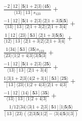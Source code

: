 \documentclass[varwidth, border=5pt]{standalone}
\begin{document}
\begin{my}
$\begin{gathered}
\scriptscriptstyle\frac{-2[12][𝟓|1+2|3⟩⟨4𝟓⟩}{⟨13⟩[13]s_{123}} +\\
\scriptscriptstyle\frac{-1[12][𝟓|1+2|3⟩⟨2|1+3|𝟓|𝟓⟩}{⟨13⟩[13]⟨2|1+3|2]⟨2|1+3|4]} +\\
\scriptscriptstyle\frac{1[12]⟨23⟩[𝟓3]⟨2|1+3|𝟓|𝟓⟩}{⟨12⟩[13]⟨2|1+3|2]⟨2|1+3|4]} +\\
\scriptscriptstyle\frac{1⟨34⟩[𝟓3]⟨3𝟓⟩s_{123}}{⟨23⟩⟨1|2+4|3]⟨3|𝟓|3]} +\\
\scriptscriptstyle\frac{-1[12][𝟓|1+2|3⟩⟨2𝟓⟩}{⟨13⟩[13]⟨2|1+3|4]} +\\
\scriptscriptstyle\frac{1⟨3|1+2|3]⟨4|2+3|1][𝟓3]⟨2𝟓⟩}{[13]⟨23⟩⟨1|2+4|3]⟨2|1+4|3]} +\\
\scriptscriptstyle\frac{-1[12]⟨14⟩[𝟓3]⟨3𝟓⟩}{⟨13⟩[13]⟨1|2+4|3]} +\\
\scriptscriptstyle\frac{1/12⟨34⟩⟨3|1+2|3][𝟓1][1|𝟓|𝟓⟩}{[13]⟨23⟩(⟨2|3|𝟓|1|2]-⟨3|4|𝟓|1|3])} \phantom{+}
\end{gathered}$
\end{my}
\end{document}
